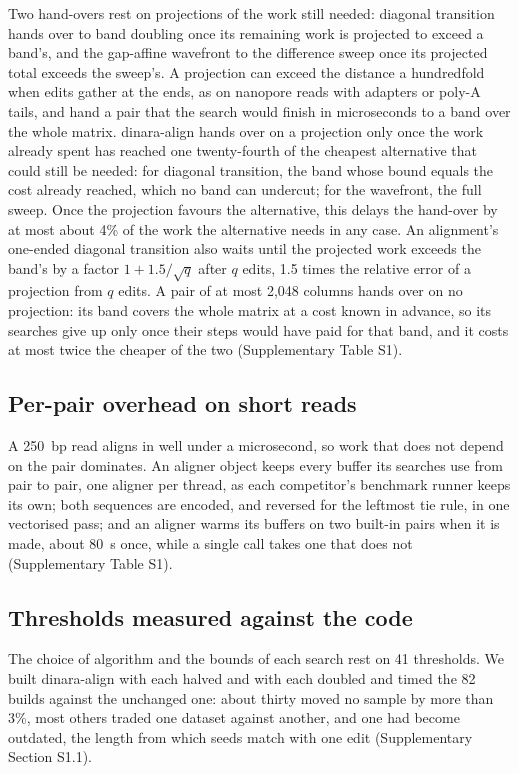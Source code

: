 Two hand-overs rest on projections of the work still needed: diagonal transition hands over to band doubling once its remaining work is projected to exceed a band's, and the gap-affine wavefront to the difference sweep once its projected total exceeds the sweep's. A projection can exceed the distance a hundredfold when edits gather at the ends, as on nanopore reads with adapters or poly-A tails, and hand a pair that the search would finish in microseconds to a band over the whole matrix. dinara-align hands over on a projection only once the work already spent has reached one twenty-fourth of the cheapest alternative that could still be needed: for diagonal transition, the band whose bound equals the cost already reached, which no band can undercut; for the wavefront, the full sweep. Once the projection favours the alternative, this delays the hand-over by at most about 4\% of the work the alternative needs in any case. An alignment's one-ended diagonal transition also waits until the projected work exceeds the band's by a factor \(1 + 1.5/\sqrt{q}\) after \(q\) edits, 1.5 times the relative error of a projection from \(q\) edits. A pair of at most 2{,}048 columns hands over on no projection: its band covers the whole matrix at a cost known in advance, so its searches give up only once their steps would have paid for that band, and it costs at most twice the cheaper of the two (Supplementary Table S1).

\subsection{Per-pair overhead on short reads}

A 250~bp read aligns in well under a microsecond, so work that does not depend on the pair dominates. An aligner object keeps every buffer its searches use from pair to pair, one aligner per thread, as each competitor's benchmark runner keeps its own; both sequences are encoded, and reversed for the leftmost tie rule, in one vectorised pass; and an aligner warms its buffers on two built-in pairs when it is made, about 80~\textmu s once, while a single call takes one that does not (Supplementary Table S1).

\subsection{Thresholds measured against the code}

The choice of algorithm and the bounds of each search rest on 41 thresholds. We built dinara-align with each halved and with each doubled and timed the 82 builds against the unchanged one: about thirty moved no sample by more than 3\%, most others traded one dataset against another, and one had become outdated, the length from which seeds match with one edit (Supplementary Section S1.1).


